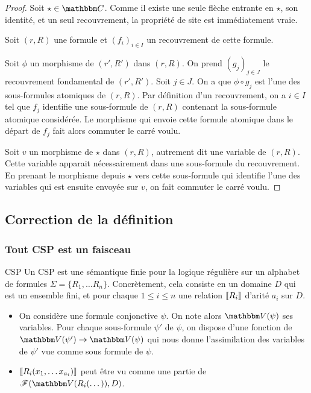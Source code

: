 \begin{proof}
    Soit $\star\in\C$. Comme il existe une seule flèche entrante en $\star$, son identité,
    et un seul recouvrement, la propriété de site est immédiatement vraie.

    Soit $(r,R)$ une formule et $(f_i)_{i\in I}$ un recouvrement de cette formule.
    
    Soit $\phi$ un morphisme de $(r', R')$ dans $(r,R)$. On prend $(g_j)_{j\in J}$ le
    recouvrement fondamental de $(r', R')$. Soit $j\in J$. On a que $\phi\circ g_j$ est
    l'une des sous-formules atomiques de $(r,R)$. Par définition d'un recouvrement, on
    a $i\in I$ tel que $f_j$ identifie une sous-formule de $(r,R)$ contenant la
    sous-formule atomique considérée. Le morphisme qui envoie cette formule atomique
    dans le départ de $f_j$ fait alors commuter le carré voulu.

    Soit $v$ un morphisme de $\star$ dans $(r,R)$, autrement dit une variable de $(r,R)$.
    Cette variable apparait nécessairement dans une sous-formule du recouvrement. En
    prenant le morphisme depuis $\star$ vers cette sous-formule qui identifie l'une des
    variables qui est ensuite envoyée sur $v$, on fait commuter le carré voulu.
\end{proof}

\subsection{Correction de la définition}

\subsubsection{Tout CSP est un faisceau}

\begin{defi}{CSP}
    Un CSP est une sémantique finie pour la logique régulière sur un alphabet de formules 
    $\Sigma = \{R_1, \dots R_n\}$. Concrètement, cela consiste en un domaine $D$ qui est
    un ensemble fini, et pour chaque $1\leq i\leq n$ une relation $\llbracket {R_i} \rrbracket$
    d'arité $a_i$ sur $D$.
\end{defi}

\begin{rem}\begin{itemize}
    \item On considère une formule conjonctive $\psi$. On note alors $\V(\psi)$ ses 
        variables.  Pour chaque sous-formule $\psi'$ de $\psi$, on dispose
        d'une fonction de $\V(\psi')\rightarrow\V(\psi)$ qui nous donne
        l'assimilation des variables de $\psi'$ vue comme sous formule de
        $\psi$.

    \item $\llbracket {R_i(x_1, \dots x_{a_i})} \rrbracket$ peut être vu comme une partie de
        $\fns(\V(R_i(\dots)), D)$.
\end{itemize}\end{rem}

